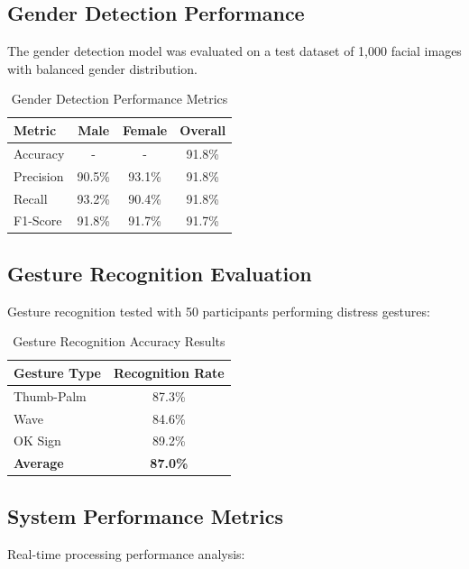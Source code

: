 \documentclass[12pt,a4paper]{article}
\begin{document}
\subsection{Gender Detection Performance}
The gender detection model was evaluated on a test dataset of 1,000 facial images with balanced gender distribution.

\begin{table}[h]
\centering
\begin{tabular}{|l|c|c|c|}
\hline
\textbf{Metric} & \textbf{Male} & \textbf{Female} & \textbf{Overall} \\
\hline
Accuracy & - & - & 91.8\% \\
\hline
Precision & 90.5\% & 93.1\% & 91.8\% \\
\hline
Recall & 93.2\% & 90.4\% & 91.8\% \\
\hline
F1-Score & 91.8\% & 91.7\% & 91.7\% \\
\hline
\end{tabular}
\caption{Gender Detection Performance Metrics}
\label{tab:gender-detection-performance}
\end{table}

\subsection{Gesture Recognition Evaluation}
Gesture recognition tested with 50 participants performing distress gestures:

\begin{table}[h]
\centering
\begin{tabular}{|l|c|}
\hline
\textbf{Gesture Type} & \textbf{Recognition Rate} \\
\hline
Thumb-Palm & 87.3\% \\
\hline
Wave & 84.6\% \\
\hline
OK Sign & 89.2\% \\
\hline
\textbf{Average} & \textbf{87.0\%} \\
\hline
\end{tabular}
\caption{Gesture Recognition Accuracy Results}
\label{tab:gesture-recognition-results}
\end{table}

\subsection{System Performance Metrics}
Real-time processing performance analysis:
\end{document}
